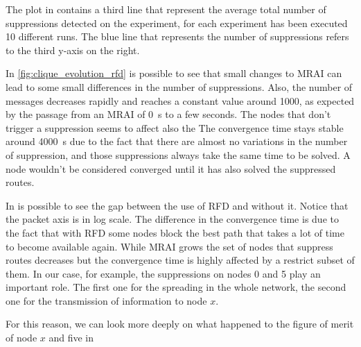 The plot in  contains a third line that represent
the average total number of suppressions detected on the experiment, for each experiment
has been executed \num{10} different runs.
The blue line that represents the number of suppressions refers to the third y-axis
on the right.

In \cref{fig:clique_evolution_rfd} is possible to see that small changes to \ac{MRAI}
can lead to some small differences in the number of suppressions.
Also, the number of messages decreases rapidly and reaches a constant
value around \num{1000}, as expected by the passage from an \ac{MRAI} of \SI{0}{\second}
to a few seconds.
The nodes that don't trigger a suppression seems to affect also the
The convergence time stays stable around \SI{4000}{\second} due to the
fact that there are almost no variations in the number of suppression,
and those suppressions always take the same time to be solved.
A node wouldn't be considered converged until it has also solved the suppressed
routes.

In  is possible to see the
gap between the use of \ac{RFD} and without it.
Notice that the packet axis is in log scale.
The difference in the convergence time is due to the fact that with \ac{RFD} some
nodes block the best path that takes a lot of time to become available again.
While \ac{MRAI} grows the set of nodes that suppress routes decreases but the
convergence time is highly affected by a restrict subset of them.
In our case, for example, the suppressions on nodes \num{0} and \num{5} play
an important role.
The first one for the spreading in the whole network, the second one for the
transmission of information to node $x$.

For this reason, we can look more deeply on what happened to the figure of merit
of node $x$ and five in 

